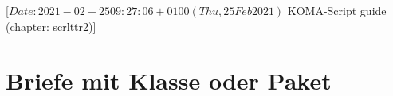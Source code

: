 %
%
%
%
%
%
%
%
% 
%
%
%
%

%
                 [$Date: 2021-02-25 09:27:06 +0100 (Thu, 25 Feb 2021) $
                  KOMA-Script guide (chapter: scrlttr2)]

\chapter{Briefe mit Klasse  oder Paket }

\BeginIndexGroup
{}%
%
\iffalse%
Briefe sind in vielerlei Hinsicht etwas ganz anderes als Artikel, Berichte,
Bücher oder Ähnliches. Schon allein deshalb gibt es für Briefe ein eigenes
Kapitel.%
\iffalse%
Aber auch aus weiteren Gründen ist ein eigenes Kapitel für
\Class{scrlttr2} und \Package{scrletter} gerechtfertigt.%
\fi%
\fi%


